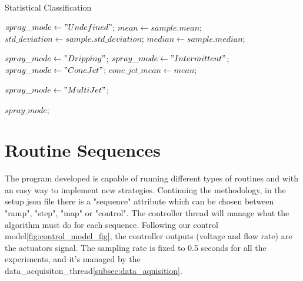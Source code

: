 	\begin{algorithm}
        \caption{Statistical Classification}\label{alg:statistical_class}
        \begin{algorithmic}

            \State $spray\_mode \gets "Undefined"$;
            \State $mean \gets sample.mean$; 
            \State $std\_deviation \gets sample.std\_deviation$;
            \State $median \gets sample.median$;
            
                \State $spray\_mode \gets "Dripping"$;
                \State $spray\_ mode \gets "Intermittent"$;
                \State $spray\_ mode \gets "Cone Jet"$;
                \State $cone\_jet\_mean \gets mean$;
            \EndIf

            \EndIf

                    \State $spray\_ mode \gets "Multi Jet"$;
                \EndIf
            \EndIf

            \Return $spray\_ mode$;
        \EndFunction
        \end{algorithmic}
    \end{algorithm}



\section{Routine Sequences}
\label{sec:routine_sequences}

    The program developed is capable of running different types of routines and with an easy way to implement new strategies.
    Continuing the methodology, in the setup json file there is a "sequence" attribute which can be chosen between "ramp", "step", "map" or "control".
    The controller thread will manage what the algorithm must do for each sequence.
    Following our control model\ref{fig:control_model_fig}, the controller outputs (voltage and flow rate) are the actuators signal.
    The sampling rate is fixed to 0.5 seconds for all the experiments, and it's managed by the data\_acquisiton\_thread\ref{subsec:data_aquisition}.


